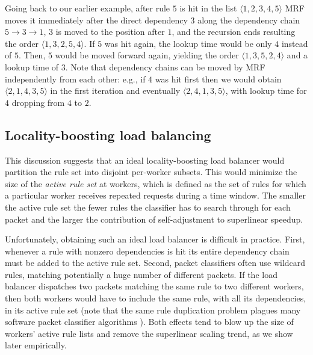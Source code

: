 Going back to our earlier example, after rule $5$ is hit in the list $\langle1, 2, 3, 4, 5\rangle$ MRF moves it immediately after the direct dependency $3$ along the dependency chain $5\to 3\to 1$, $3$ is moved to the position after $1$, and the recursion ends resulting the order $\langle1, 3, 2, 5, 4\rangle$. If $5$ was hit again, the lookup time would be only $4$ instead of $5$. Then, $5$ would be moved forward again, yielding the order $\langle1, 3, 5, 2, 4\rangle$ and a lookup time of $3$. Note that dependency chains can be moved by MRF independently from each other: e.g., if $4$ was hit first then we would obtain $\langle2, 1, 4, 3, 5\rangle$ in the first iteration and eventually $\langle2, 4, 1, 3, 5\rangle$, with lookup time for $4$ dropping from $4$ to $2$.

\subsection{Locality-boosting load balancing}
\label{sec:sa-rss}

This discussion suggests that an ideal locality-boosting load balancer would partition the rule set into disjoint per-worker subsets. This would minimize the size of the \emph{active rule set} at workers, which is defined as the set of rules for which a particular worker receives repeated requests during a time window. The smaller the active rule set the fewer rules the classifier has to search through for each packet and the larger the contribution of self-adjustment to superlinear speedup.

Unfortunately, obtaining such an ideal load balancer is difficult in practice. First, whenever a rule with nonzero dependencies is hit its entire dependency chain must be added to the active rule set. Second, packet classifiers often use wildcard rules, matching potentially a huge number of different packets. If the load balancer dispatches two packets matching the same rule to two different workers, then both workers would have to include the same rule, with all its dependencies, in its active rule set (note that the same rule duplication problem plagues many software packet classifier algorithms \cite{10.1145/863955.863980, 820051, 10.1145/1851182.1851208, 8485947}). Both effects tend to blow up the size of workers' active rule lists and remove the superlinear scaling trend, as we show later empirically.


